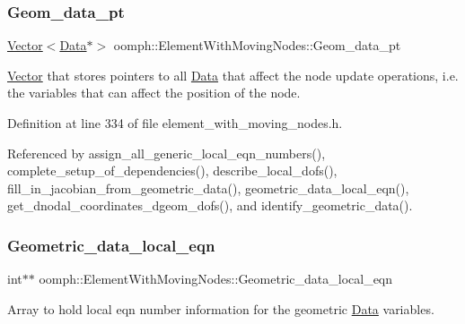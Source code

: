 \subsubsection{\texorpdfstring{Geom\+\_\+data\+\_\+pt}{Geom\_data\_pt}}
{\footnotesize\ttfamily \hyperlink{classoomph_1_1Vector}{Vector}$<$\hyperlink{classoomph_1_1Data}{Data}$\ast$$>$ oomph\+::\+Element\+With\+Moving\+Nodes\+::\+Geom\+\_\+data\+\_\+pt\hspace{0.3cm}{\ttfamily [protected]}}



\hyperlink{classoomph_1_1Vector}{Vector} that stores pointers to all \hyperlink{classoomph_1_1Data}{Data} that affect the node update operations, i.\+e. the variables that can affect the position of the node. 



Definition at line 334 of file element\+\_\+with\+\_\+moving\+\_\+nodes.\+h.



Referenced by assign\+\_\+all\+\_\+generic\+\_\+local\+\_\+eqn\+\_\+numbers(), complete\+\_\+setup\+\_\+of\+\_\+dependencies(), describe\+\_\+local\+\_\+dofs(), fill\+\_\+in\+\_\+jacobian\+\_\+from\+\_\+geometric\+\_\+data(), geometric\+\_\+data\+\_\+local\+\_\+eqn(), get\+\_\+dnodal\+\_\+coordinates\+\_\+dgeom\+\_\+dofs(), and identify\+\_\+geometric\+\_\+data().

\mbox{\label{classoomph_1_1ElementWithMovingNodes_ad4f650e53dab1492ef757ab5e69c66ff}} 
\subsubsection{\texorpdfstring{Geometric\+\_\+data\+\_\+local\+\_\+eqn}{Geometric\_data\_local\_eqn}}
{\footnotesize\ttfamily int$\ast$$\ast$ oomph\+::\+Element\+With\+Moving\+Nodes\+::\+Geometric\+\_\+data\+\_\+local\+\_\+eqn\hspace{0.3cm}{\ttfamily [private]}}



Array to hold local eqn number information for the geometric \hyperlink{classoomph_1_1Data}{Data} variables. 



